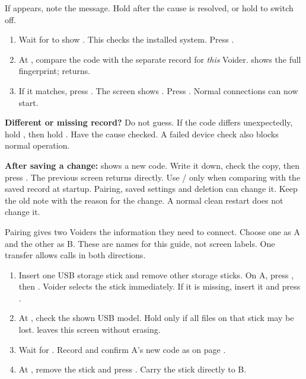 If  appears, note the message. Hold  after the cause is resolved, or hold  to switch off.

\begin{enumerate}
\item Wait for  to show . This checks the installed system. Press .
\item At , compare the code with the separate record for \emph{this} Voider.  shows the full fingerprint;  returns.
\item If it matches, press . The screen shows . Press . Normal connections can now start.
\end{enumerate}
\textbf{Different or missing record?} Do not guess. If the code differs unexpectedly, hold , then hold . Have the cause checked. A failed device check also blocks normal operation.

\textbf{After saving a change:}  shows a new code. Write it down, check the copy, then press . The previous screen returns directly. Use / only when comparing with the saved record at startup. Pairing, saved settings and deletion can change it. Keep the old note with the reason for the change. A normal clean restart does not change it.

Pairing gives two Voiders the information they need to connect. Choose one as A and the other as B. These are names for this guide, not screen labels. One transfer allows calls in both directions.
\begin{enumerate}
\item Insert one USB storage stick and remove other storage sticks. On A, press , then . Voider selects the stick immediately. If it is missing, insert it and press .
\item At , check the shown USB model. Hold  only if all files on that stick may be lost.  leaves this screen without erasing.
\item Wait for . Record and confirm A's new code as on page \pageref{en:check}.
\item At , remove the stick and press . Carry the stick directly to B.
\end{enumerate}

